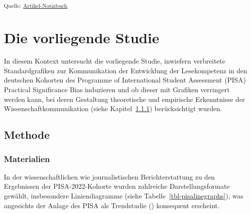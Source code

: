 \documentclass[
  jou,
  floatsintext,
  longtable,
  nolmodern,
  notxfonts,
  notimes,
  colorlinks=true,linkcolor=blue,citecolor=blue,urlcolor=blue]{apa7}
\begin{document}
\textsubscript{Quelle:
\href{https://sammerk.github.io/StudienergebnisseBesserKommunizieren/index.qmd.html}{Artikel-Notizbuch}}

\section{Die vorliegende Studie}\label{die-vorliegende-studie}

In diesem Kontext untersucht die vorliegende Studie, inwiefern
verbreitete Standardgrafiken zur Kommunikation der Entwicklung der
Lesekompetenz in den deutschen Kohorten des Programme of International
Student Assessment (PISA) Practical Significance Bias induzieren und ob
dieser mit Grafiken verringert werden kann, bei deren Gestaltung
theoretische und empirische Erkenntnisse der Wissenschaftkommunikation
(siehe Kapitel~\ref{sec-materialien}) berücksichtigt wurden.

\subsection{Methode}\label{methode}

\subsubsection{Materialien}\label{sec-materialien}

In der wissenschaftlichen wie journalistischen Berichterstattung zu den
Ergebnissen der PISA-2022-Kohorte wurden zahlreiche Darstellungsformate
gewählt, insbesondere Liniendiagramme (siehe
Tabelle~\ref{tbl-pisalinegraphs}), was angesichts der Anlage des PISA
als Trendstudie ()
konsequent erscheint.
\end{document}
